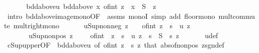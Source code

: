 \begin{isabellebody}
\ \ \isanewline
\ \ \isamarkupfalse%
\ bdd{\isacharunderscore}{\kern0pt}above{\isacharunderscore}{\kern0pt}u{\isacharcolon}{\kern0pt}\ {\isachardoublequoteopen}bdd{\isacharunderscore}{\kern0pt}above\ {\isacharparenleft}{\kern0pt}{\isacharparenleft}{\kern0pt}{\isasymlambda}x{\isachardot}{\kern0pt}\ {\isasymlfloor}of{\isacharunderscore}{\kern0pt}int\ {\isasymbar}z{\isasymbar}\ {\isacharasterisk}{\kern0pt}\ x{\isasymrfloor}{\isacharparenright}{\kern0pt}\ {\isacharbackquote}{\kern0pt}\ S{\isacharparenright}{\kern0pt}{\isachardoublequoteclose}\ \ z\ \isamarkupfalse%
\ {\isacharparenleft}{\kern0pt}intro\ bdd{\isacharunderscore}{\kern0pt}above{\isacharunderscore}{\kern0pt}image{\isacharunderscore}{\kern0pt}mono{\isacharbrackleft}{\kern0pt}OF\ {\isacharunderscore}{\kern0pt}\ assms{\isacharparenleft}{\kern0pt}{}{\isacharparenright}{\kern0pt}{\isacharbrackright}{\kern0pt}\ monoI{\isacharparenright}{\kern0pt}\ {\isacharparenleft}{\kern0pt}simp\ add{\isacharcolon}{\kern0pt}\ floor{\isacharunderscore}{\kern0pt}mono\ mult{\isachardot}{\kern0pt}commute\ mult{\isacharunderscore}{\kern0pt}right{\isacharunderscore}{\kern0pt}mono{\isacharparenright}{\kern0pt}\isanewline
\ \ \isanewline
\ \ \isamarkupfalse%
\ u{\isacharunderscore}{\kern0pt}Sup{\isacharunderscore}{\kern0pt}nonneg{\isacharcolon}{\kern0pt}\ {\isachardoublequoteopen}z\ {\isasymge}\ {}\ {\isasymLongrightarrow}\ {\isasymlfloor}of{\isacharunderscore}{\kern0pt}int\ z\ {\isacharasterisk}{\kern0pt}\ s{\isasymrfloor}\ {\isasymle}\ u\ z{\isachardoublequoteclose}\ \ \isanewline
\ \ \ \ \ \ \ u{\isacharunderscore}{\kern0pt}Sup{\isacharunderscore}{\kern0pt}nonpos{\isacharcolon}{\kern0pt}\ {\isachardoublequoteopen}z\ {\isasymle}\ {}\ {\isasymLongrightarrow}\ {\isacharminus}{\kern0pt}\ {\isasymlfloor}of{\isacharunderscore}{\kern0pt}int\ {\isacharparenleft}{\kern0pt}{\isacharminus}{\kern0pt}\ z{\isacharparenright}{\kern0pt}\ {\isacharasterisk}{\kern0pt}\ s{\isasymrfloor}\ {\isasymge}\ u\ z{\isachardoublequoteclose}\ \ {\isachardoublequoteopen}s\ {\isasymin}\ S{\isachardoublequoteclose}\ \ s\ z\ \isanewline
\ \ \ \ \isamarkupfalse%
\ u{\isacharunderscore}{\kern0pt}def\ \isamarkupfalse%
\ cSup{\isacharunderscore}{\kern0pt}upper{\isacharbrackleft}{\kern0pt}OF\ {\isacharunderscore}{\kern0pt}\ bdd{\isacharunderscore}{\kern0pt}above{\isacharunderscore}{\kern0pt}u{\isacharcomma}{\kern0pt}\ of\ {\isachardoublequoteopen}{\isasymlfloor}of{\isacharunderscore}{\kern0pt}int\ {\isasymbar}z{\isasymbar}\ {\isacharasterisk}{\kern0pt}\ s{\isasymrfloor}{\isachardoublequoteclose}\ z{\isacharbrackright}{\kern0pt}\ that\ abs{\isacharunderscore}{\kern0pt}of{\isacharunderscore}{\kern0pt}nonpos\ zsgn{\isacharunderscore}{\kern0pt}def\ \isamarkupfalse%

\end{isabellebody}
